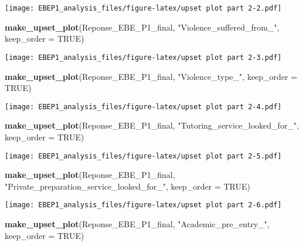 \documentclass[
]{article}
\newenvironment{Shaded}{\begin{snugshade}}{\end{snugshade}}
\newcommand{\AttributeTok}[1]{\textcolor[rgb]{0.13,0.29,0.53}{#1}}
\newcommand{\ConstantTok}[1]{\textcolor[rgb]{0.56,0.35,0.01}{#1}}
\newcommand{\FunctionTok}[1]{\textcolor[rgb]{0.13,0.29,0.53}{\textbf{#1}}}
\newcommand{\NormalTok}[1]{#1}
\newcommand{\StringTok}[1]{\textcolor[rgb]{0.31,0.60,0.02}{#1}}
\begin{document}
\texttt{[image: EBEP1\_analysis\_files/figure-latex/upset plot part 2-2.pdf]}

\begin{Shaded}
\begin{Highlighting}[]
\FunctionTok{make\_upset\_plot}\NormalTok{(Reponse\_EBE\_P1\_final, }\StringTok{"Violence\_suffered\_from\_"}\NormalTok{, }\AttributeTok{keep\_order =} \ConstantTok{TRUE}\NormalTok{)}
\end{Highlighting}
\end{Shaded}

\texttt{[image: EBEP1\_analysis\_files/figure-latex/upset plot part 2-3.pdf]}

\begin{Shaded}
\begin{Highlighting}[]
\FunctionTok{make\_upset\_plot}\NormalTok{(Reponse\_EBE\_P1\_final, }\StringTok{"Violence\_type\_"}\NormalTok{, }\AttributeTok{keep\_order =} \ConstantTok{TRUE}\NormalTok{) }
\end{Highlighting}
\end{Shaded}

\texttt{[image: EBEP1\_analysis\_files/figure-latex/upset plot part 2-4.pdf]}

\begin{Shaded}
\begin{Highlighting}[]
\FunctionTok{make\_upset\_plot}\NormalTok{(Reponse\_EBE\_P1\_final, }\StringTok{"Tutoring\_service\_looked\_for\_"}\NormalTok{, }\AttributeTok{keep\_order =} \ConstantTok{TRUE}\NormalTok{) }
\end{Highlighting}
\end{Shaded}

\texttt{[image: EBEP1\_analysis\_files/figure-latex/upset plot part 2-5.pdf]}

\begin{Shaded}
\begin{Highlighting}[]
\FunctionTok{make\_upset\_plot}\NormalTok{(Reponse\_EBE\_P1\_final, }\StringTok{"Private\_preparation\_service\_looked\_for\_"}\NormalTok{, }\AttributeTok{keep\_order =} \ConstantTok{TRUE}\NormalTok{) }
\end{Highlighting}
\end{Shaded}

\texttt{[image: EBEP1\_analysis\_files/figure-latex/upset plot part 2-6.pdf]}

\begin{Shaded}
\begin{Highlighting}[]
\FunctionTok{make\_upset\_plot}\NormalTok{(Reponse\_EBE\_P1\_final, }\StringTok{"Academic\_pre\_entry\_"}\NormalTok{, }\AttributeTok{keep\_order =} \ConstantTok{TRUE}\NormalTok{) }
\end{Highlighting}
\end{Shaded}
\end{document}
